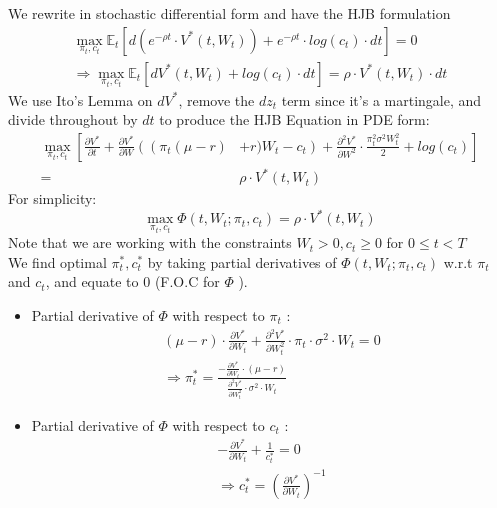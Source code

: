 \documentclass{article}
\begin{document}
We rewrite in stochastic differential form and have the HJB formulation
$$
\begin{gathered}
\max _{\pi_{t}, c_{t}} \mathbb{E}_{t}\left[d\left(e^{-\rho t} \cdot V^{*}\left(t, W_{t}\right)\right)+e^{-\rho t} \cdot log(c_{t}) \cdot d t\right]=0 \\
\Rightarrow \max _{\pi_{t}, c_{t}} \mathbb{E}_{t}\left[d V^{*}\left(t, W_{t}\right)+log(c_{t}) \cdot d t\right]=\rho \cdot V^{*}\left(t, W_{t}\right) \cdot d t
\end{gathered}
$$
We use Ito's Lemma on $d V^{*}$, remove the $d z_{t}$ term since it's a martingale, and divide throughout by $d t$ to produce the HJB Equation in PDE form:
$$
\begin{aligned}
\max _{\pi_{t}, c_{t}}\left[\frac{\partial V^{*}}{\partial t}+\frac{\partial V^{*}}{\partial W}\left(\left(\pi_{t}(\mu-r)\right.\right.\right.&\left.\left.+r) W_{t}-c_{t}\right)+\frac{\partial^{2} V^{*}}{\partial W^{2}} \cdot \frac{\pi_{t}^{2} \sigma^{2} W_{t}^{2}}{2}+log(c_t)\right] \\
=& \rho \cdot V^{*}\left(t, W_{t}\right)
\end{aligned}
$$
For simplicity:
$$
\max _{\pi_{t}, c_{t}} \Phi\left(t, W_{t} ; \pi_{t}, c_{t}\right)=\rho \cdot V^{*}\left(t, W_{t}\right)
$$
Note that we are working with the constraints $W_{t}>0, c_{t} \geq 0$ for $0 \leq t<T$\\
We find optimal $\pi_{t}^{*}, c_{t}^{*}$ by taking partial derivatives of $\Phi\left(t, W_{t} ; \pi_{t}, c_{t}\right)$ w.r.t $\pi_{t}$ and $c_{t}$, and equate to 0 (F.O.C for $\Phi$ ).
\begin{itemize}
\item Partial derivative of $\Phi$ with respect to $\pi_{t}$ :
$$
\begin{gathered}
(\mu-r) \cdot \frac{\partial V^{*}}{\partial W_{t}}+\frac{\partial^{2} V^{*}}{\partial W_{t}^{2}} \cdot \pi_{t} \cdot \sigma^{2} \cdot W_{t}=0 \\
\Rightarrow \pi_{t}^{*}=\frac{-\frac{\partial V^{*}}{\partial W_{t}} \cdot(\mu-r)}{\frac{\partial^{2} V^{*}}{\partial W_{t}^{2}} \cdot \sigma^{2} \cdot W_{t}}
\end{gathered}
$$
\item Partial derivative of $\Phi$ with respect to $c_{t}$ :
$$
\begin{gathered}
-\frac{\partial V^{*}}{\partial W_{t}}+
\frac{1}{c_{t}^{*}}=0 \\
\Rightarrow c_{t}^{*}=\left(\frac{\partial V^{*}}{\partial W_{t}}\right)^{-1}
\end{gathered}
$$
\end{itemize}
\end{document}
